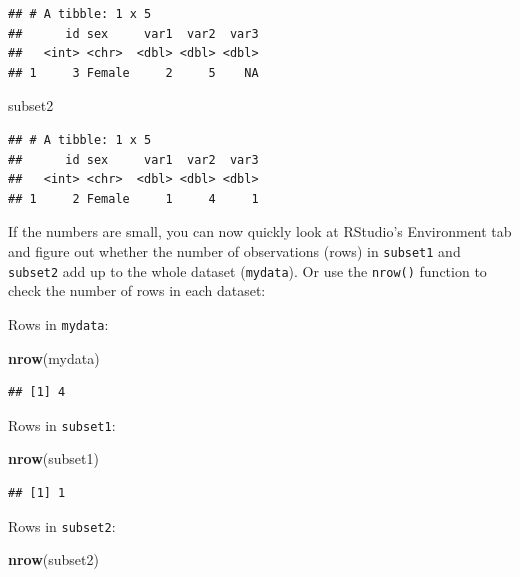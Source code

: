 \documentclass[
  12pt,
  krantz2]{krantz}
\makeatletter
\newenvironment{Shaded}{\begin{snugshade}}{\end{snugshade}}
\newcommand{\KeywordTok}[1]{\textcolor[rgb]{0.13,0.29,0.53}{\textbf{#1}}}
\newcommand{\NormalTok}[1]{#1}
\newenvironment{kframe}{%
\medskip{}
\setlength{\fboxsep}{.8em}
 \def\at@end@of@kframe{}%
 \ifinner\ifhmode%
  \def\at@end@of@kframe{\end{minipage}}%
  \begin{minipage}{\columnwidth}%
 \fi\fi%
 \def\FrameCommand##1{\hskip\@totalleftmargin \hskip-\fboxsep
 \colorbox{shadecolor}{##1}\hskip-\fboxsep
     \hskip-\linewidth \hskip-\@totalleftmargin \hskip\columnwidth}%
 \MakeFramed {\advance\hsize-\width
   \@totalleftmargin\z@ \linewidth\hsize
   \@setminipage}}%
 {\par\unskip\endMakeFramed%
 \at@end@of@kframe}
\renewenvironment{Shaded}{\begin{kframe}}{\end{kframe}}
\makeatother
\begin{document}
\begin{verbatim}
## # A tibble: 1 x 5
##      id sex     var1  var2  var3
##   <int> <chr>  <dbl> <dbl> <dbl>
## 1     3 Female     2     5    NA
\end{verbatim}

\begin{Shaded}
\begin{Highlighting}[]
\NormalTok{subset2}
\end{Highlighting}
\end{Shaded}

\begin{verbatim}
## # A tibble: 1 x 5
##      id sex     var1  var2  var3
##   <int> <chr>  <dbl> <dbl> <dbl>
## 1     2 Female     1     4     1
\end{verbatim}

If the numbers are small, you can now quickly look at RStudio's Environment tab and figure out whether the number of observations (rows) in \texttt{subset1} and \texttt{subset2} add up to the whole dataset (\texttt{mydata}). Or use the \texttt{nrow()} function to check the number of rows in each dataset:

Rows in \texttt{mydata}:

\begin{Shaded}
\begin{Highlighting}[]
\KeywordTok{nrow}\NormalTok{(mydata)}
\end{Highlighting}
\end{Shaded}

\begin{verbatim}
## [1] 4
\end{verbatim}

Rows in \texttt{subset1}:

\begin{Shaded}
\begin{Highlighting}[]
\KeywordTok{nrow}\NormalTok{(subset1)}
\end{Highlighting}
\end{Shaded}

\begin{verbatim}
## [1] 1
\end{verbatim}

Rows in \texttt{subset2}:

\begin{Shaded}
\begin{Highlighting}[]
\KeywordTok{nrow}\NormalTok{(subset2)}
\end{Highlighting}
\end{Shaded}
\end{document}
